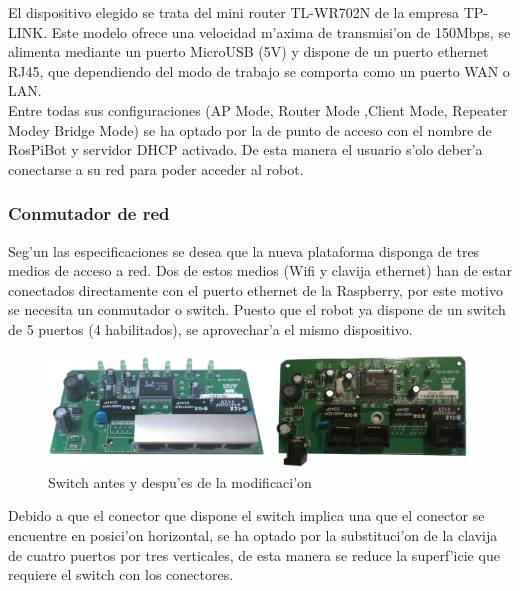 \documentclass[twoside,12pt]{article}
\begin{document}
El dispositivo elegido se trata del mini router TL-WR702N de la empresa TP-LINK. Este modelo ofrece una velocidad m'axima de transmisi'on de 150Mbps, se alimenta mediante un puerto MicroUSB (5V) y dispone de un puerto ethernet RJ45, que dependiendo del modo de trabajo se comporta como un puerto WAN o LAN.\\

Entre todas sus configuraciones (AP Mode, Router Mode ,Client Mode,
Repeater Modey  Bridge Mode) se ha optado por la de punto de acceso con el nombre de RosPiBot y servidor DHCP activado. De esta manera el usuario s'olo deber'a conectarse a su red para poder acceder al robot.

\subsubsection{Conmutador de red}
Seg'un las especificaciones se desea que la nueva plataforma disponga de tres medios de acceso a red. Dos de estos medios (Wifi y clavija ethernet) han de estar conectados directamente con el puerto ethernet de la Raspberry, por este motivo se necesita un conmutador o switch. Puesto que el robot ya dispone de un switch de 5 puertos (4 habilitados), se aprovechar'a el mismo dispositivo.\\

\begin{figure}[ht]
\centering
\includegraphics[scale=0.35]{images/switch_comparative.png} 
\caption{Switch antes y despu'es de la modificaci'on}
\label{fig:switch_comparative}
\end{figure}

Debido a que el conector que dispone el switch implica una que el conector se encuentre en posici'on horizontal, se ha optado por la substituci'on de la clavija de cuatro puertos por tres verticales, de esta manera se reduce la superf'icie que requiere el switch con los conectores.
\end{document}
